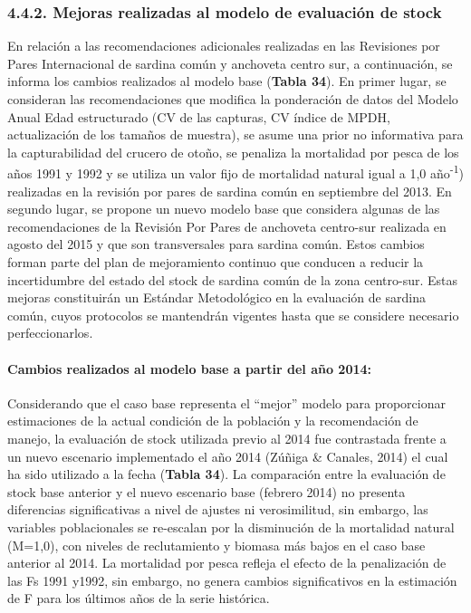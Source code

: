 \documentclass[
  spanish,
]{article}
\begin{document}
\hypertarget{mejoras-realizadas-al-modelo-de-evaluaciuxf3n-de-stock}{%
\subsubsection{4.4.2. Mejoras realizadas al modelo de evaluación de
stock}\label{mejoras-realizadas-al-modelo-de-evaluaciuxf3n-de-stock}}

En relación a las recomendaciones adicionales realizadas en las
Revisiones por Pares Internacional de sardina común y anchoveta centro
sur, a continuación, se informa los cambios realizados al modelo base
(\textbf{Tabla 34}). En primer lugar, se consideran las recomendaciones
que modifica la ponderación de datos del Modelo Anual Edad estructurado
(CV de las capturas, CV índice de MPDH, actualización de los tamaños de
muestra), se asume una prior no informativa para la capturabilidad del
crucero de otoño, se penaliza la mortalidad por pesca de los años 1991 y
1992 y se utiliza un valor fijo de mortalidad natural igual a 1,0
año\textsuperscript{-1}) realizadas en la revisión por pares de sardina
común en septiembre del 2013. En segundo lugar, se propone un nuevo
modelo base que considera algunas de las recomendaciones de la Revisión
Por Pares de anchoveta centro-sur realizada en agosto del 2015 y que son
transversales para sardina común. Estos cambios forman parte del plan de
mejoramiento continuo que conducen a reducir la incertidumbre del estado
del stock de sardina común de la zona centro-sur. Estas mejoras
constituirán un Estándar Metodológico en la evaluación de sardina común,
cuyos protocolos se mantendrán vigentes hasta que se considere necesario
perfeccionarlos.

\hypertarget{cambios-realizados-al-modelo-base-a-partir-del-auxf1o-2014}{%
\paragraph{Cambios realizados al modelo base a partir del año
2014:}\label{cambios-realizados-al-modelo-base-a-partir-del-auxf1o-2014}}

Considerando que el caso base representa el ``mejor'' modelo para
proporcionar estimaciones de la actual condición de la población y la
recomendación de manejo, la evaluación de stock utilizada previo al 2014
fue contrastada frente a un nuevo escenario implementado el año 2014
(Zúñiga \& Canales, 2014) el cual ha sido utilizado a la fecha
(\textbf{Tabla 34}). La comparación entre la evaluación de stock base
anterior y el nuevo escenario base (febrero 2014) no presenta
diferencias significativas a nivel de ajustes ni verosimilitud, sin
embargo, las variables poblacionales se re-escalan por la disminución de
la mortalidad natural (M=1,0), con niveles de reclutamiento y biomasa
más bajos en el caso base anterior al 2014. La mortalidad por pesca
refleja el efecto de la penalización de las Fs 1991 y1992, sin embargo,
no genera cambios significativos en la estimación de F para los últimos
años de la serie histórica.
\end{document}
